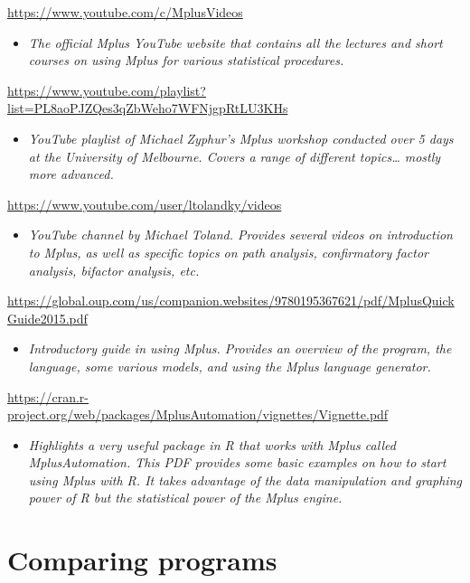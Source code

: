 \documentclass[
]{book}
\providecommand{\tightlist}{%
  \setlength{\itemsep}{0pt}\setlength{\parskip}{0pt}}
\begin{document}
\url{https://www.youtube.com/c/MplusVideos}

\begin{itemize}
\tightlist
\item
  \emph{The official Mplus YouTube website that contains all the lectures and short courses on using Mplus for various statistical procedures.}
\end{itemize}

\url{https://www.youtube.com/playlist?list=PL8aoPJZQes3qZbWeho7WFNjgpRtLU3KHs}

\begin{itemize}
\tightlist
\item
  \emph{YouTube playlist of Michael Zyphur's Mplus workshop conducted over 5 days at the University of Melbourne. Covers a range of different topics\ldots{} mostly more advanced.}
\end{itemize}

\url{https://www.youtube.com/user/ltolandky/videos}

\begin{itemize}
\tightlist
\item
  \emph{YouTube channel by Michael Toland. Provides several videos on introduction to Mplus, as well as specific topics on path analysis, confirmatory factor analysis, bifactor analysis, etc.}
\end{itemize}

\url{https://global.oup.com/us/companion.websites/9780195367621/pdf/MplusQuickGuide2015.pdf}

\begin{itemize}
\tightlist
\item
  \emph{Introductory guide in using Mplus. Provides an overview of the program, the language, some various models, and using the Mplus language generator.}
\end{itemize}

\url{https://cran.r-project.org/web/packages/MplusAutomation/vignettes/Vignette.pdf}

\begin{itemize}
\tightlist
\item
  \emph{Highlights a very useful package in R that works with Mplus called MplusAutomation. This PDF provides some basic examples on how to start using Mplus with R. It takes advantage of the data manipulation and graphing power of R but the statistical power of the Mplus engine.}
\end{itemize}

\hypertarget{comparing-programs}{%
\section{Comparing programs}\label{comparing-programs}}
\end{document}
